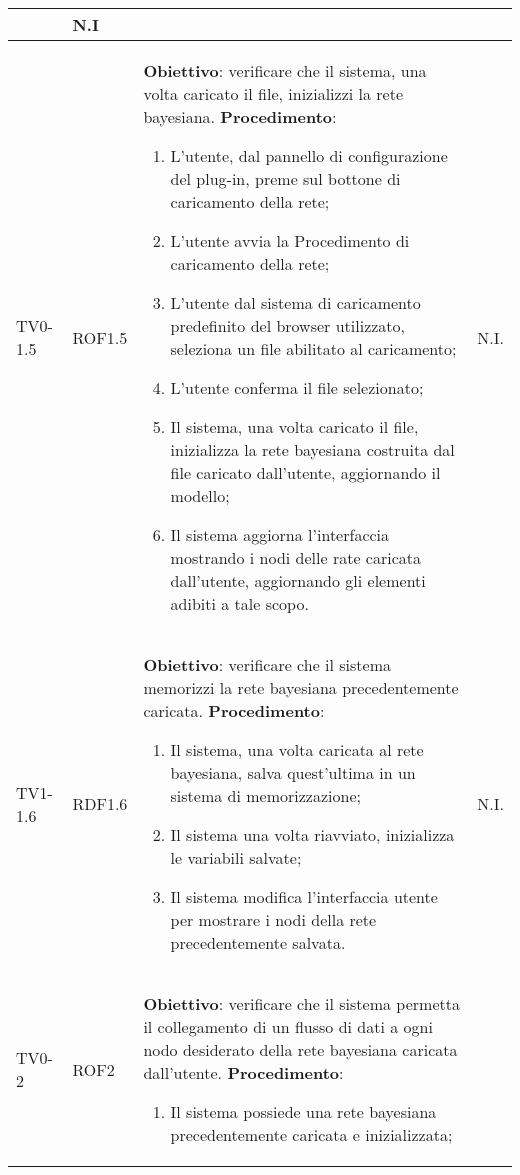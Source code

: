 \begin{longtable}{|m{}|m{}|m{}|m{}|}
\begin{enumerate}
	\end{enumerate}
	& N.I \\
\hline
\rowcolor{grigio} TV0-1.5 & ROF1.5 &
	\textbf{Obiettivo}: verificare che il sistema, una volta caricato il file, inizializzi la rete bayesiana. \newline
	\textbf{Procedimento}: 
	\begin{enumerate}
		\item L'utente, dal pannello di configurazione del plug-in, preme sul bottone di caricamento della rete; 
		\item L'utente avvia la Procedimento di caricamento della rete; 
		\item L'utente dal sistema di caricamento predefinito del browser utilizzato, seleziona un file abilitato al caricamento; 
		\item L'utente conferma il file selezionato; 
		\item Il sistema, una volta caricato il file, inizializza la rete bayesiana costruita dal file caricato dall'utente, aggiornando il modello; 
		\item Il sistema aggiorna l'interfaccia mostrando i nodi delle rate caricata dall'utente, aggiornando gli elementi adibiti a tale scopo. 
	\end{enumerate}
	& N.I. \\
\hline
TV1-1.6 & RDF1.6 &
	\textbf{Obiettivo}: verificare che il sistema memorizzi la rete bayesiana precedentemente caricata. \newline
	\textbf{Procedimento}: 
	\begin{enumerate}
		\item Il sistema, una volta caricata al rete bayesiana, salva quest'ultima in un sistema di memorizzazione;
		\item Il sistema una volta riavviato, inizializza le variabili salvate; 
		\item Il sistema modifica l'interfaccia utente per mostrare i nodi della rete precedentemente salvata. 
	\end{enumerate}	
	 & N.I. \\
\hline
\rowcolor{grigio} TV0-2 & ROF2 & 
	\textbf{Obiettivo}: verificare che il sistema permetta il collegamento di un flusso di dati a ogni nodo desiderato della rete bayesiana caricata dall'utente. \newline
	\textbf{Procedimento}: 
	\begin{enumerate}
		\item Il sistema possiede una rete bayesiana precedentemente caricata e inizializzata; 	

\end{enumerate}
\end{longtable}
